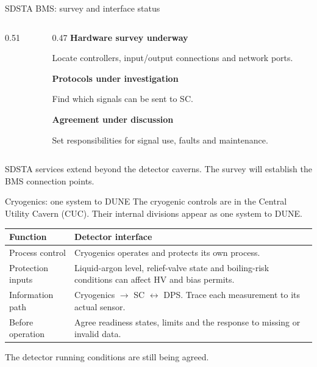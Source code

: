 \documentclass[aspectratio=169,11pt]{beamer}
\newcommand{\captionline}[1]{\par{\small\color{DuneTextMuted}#1\par}}
\begin{document}
\begin{frame}{SDSTA BMS: survey and interface status}
\begin{columns}[T,onlytextwidth]
\begin{column}{0.51\textwidth}
\centering{}
\end{column}
\begin{column}{0.47\textwidth}
\textbf{Hardware survey underway}\par
Locate controllers, input/output connections and network ports.\par\bigskip
\textbf{Protocols under investigation}\par
Find which signals can be sent to SC.\par\bigskip
\textbf{Agreement under discussion}\par
Set responsibilities for signal use, faults and maintenance.
\end{column}
\end{columns}\par\bigskip
\captionline{SDSTA services extend beyond the detector caverns. The survey will establish the BMS connection points.}
\end{frame}

\begin{frame}{Cryogenics: one system to DUNE}
The cryogenic controls are in the Central Utility Cavern (CUC).
Their internal divisions appear as one system to DUNE.\par\bigskip
\renewcommand{\arraystretch}{1.3}
\begin{tabularx}{\textwidth}{@{}>{\RaggedRight\arraybackslash}p{3cm}>{\RaggedRight\arraybackslash}X@{}}
\toprule
\textbf{Function} & \textbf{Detector interface}\\\midrule
Process control & Cryogenics operates and protects its own process.\\
Protection inputs & Liquid-argon level, relief-valve state and boiling-risk conditions can affect HV and bias permits.\\
Information path & Cryogenics $\rightarrow$ SC $\leftrightarrow$ DPS. Trace each measurement to its actual sensor.\\
Before operation & Agree readiness states, limits and the response to missing or invalid data.\\
\bottomrule
\end{tabularx}\par\medskip
The detector running conditions are still being agreed.
\end{frame}
\end{document}

